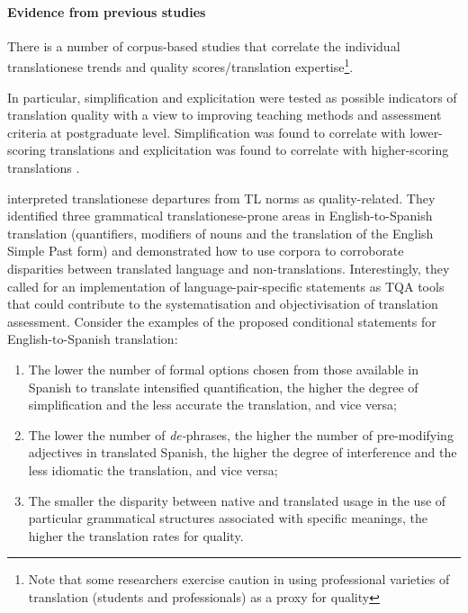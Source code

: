 \paragraph{Evidence from previous studies} There is a number of corpus-based studies that correlate the individual translationese trends and quality scores/translation expertise\footnote{Note that some researchers exercise caution in using professional varieties of translation (students and professionals) as a proxy for quality}.

In particular, simplification and explicitation were tested as possible indicators of translation quality with a view to improving teaching methods and assessment criteria at postgraduate level. Simplification was found to correlate with lower-scoring translations and explicitation was found to correlate with higher-scoring translations \cite{Scarpa2006}. 

\citet{Rabadan2009} interpreted translationese departures from TL norms as quality-related. They identified three grammatical translationese-prone areas in English-to-Spanish translation (quantifiers, modifiers of nouns and the translation of the English Simple Past form) and demonstrated how to use corpora to corroborate disparities between translated language and non-translations. %
Interestingly, they called for an implementation of language-pair-specific statements as \gls{TQA} tools that could contribute to the systematisation and objectivisation of translation assessment. Consider the examples of the proposed conditional statements for English-to-Spanish translation:

\begin{enumerate}\compresslist{}
	\item The lower the number of formal options chosen from those available in Spanish to translate intensified quantification, the higher the degree of simplification and the less accurate the translation, and vice versa;
	\item The lower the number of \textit{de-}phrases, the higher the number of pre-modifying adjectives in translated Spanish, the higher the degree of interference and the less idiomatic the translation, and vice versa;
	\item The smaller the disparity between native and translated usage in the use of particular grammatical structures associated with specific meanings, the higher the translation rates for quality.
\end{enumerate}

